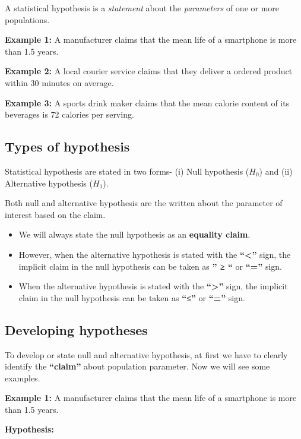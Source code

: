 \documentclass[
  11pt,
  letterpaper,
  DIV=11,
  numbers=noendperiod]{scrreprt}
\begin{document}
A statistical hypothesis is a \emph{statement} about the
\emph{parameters} of one or more populations.

\textbf{Example 1:} A manufacturer claims that the mean life of a
smartphone is more than 1.5 years.

\textbf{Example 2:} A local courier service claims that they deliver a
ordered product within 30 minutes on average.

\textbf{Example 3:} A sports drink maker claims that the mean calorie
content of its beverages is 72 calories per serving.

\subsection{Types of hypothesis}\label{types-of-hypothesis}

Statistical hypothesis are stated in two forms- (i) Null hypothesis
(\(H_0\)) and (ii) Alternative hypothesis (\(H_1\)).

Both null and alternative hypothesis are the written about the parameter
of interest based on the claim.

\begin{itemize}
\item
  We will always state the null hypothesis as an \textbf{equality
  claim}.
\item
  However, when the alternative hypothesis is stated with the
  \textbf{``\textless{}''} sign, the implicit claim in the null
  hypothesis can be taken as \textbf{'' ≥ ``} or \textbf{``=''} sign.
\item
  When the alternative hypothesis is stated with the
  \textbf{``\textgreater{}''} sign, the implicit claim in the null
  hypothesis can be taken as \textbf{``≤''} or \textbf{``=''} sign.
\end{itemize}

\subsection{Developing hypotheses}\label{developing-hypotheses}

To develop or state null and alternative hypothesis, at first we have to
clearly identify the \textbf{``claim''} about population parameter. Now
we will see some examples.

\textbf{Example 1:} A manufacturer claims that the mean life of a
smartphone is more than 1.5 years.

\textbf{Hypothesis:}
\end{document}
